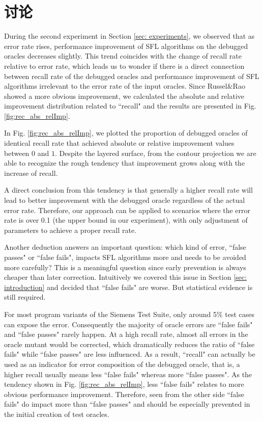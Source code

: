 \section{讨论}

During the second experiment in Section \ref{sec: experiments}, we observed that as error rate rises, performance improvement of SFL algorithms on the debugged oracles decreases slightly. This trend coincides with the change of recall rate relative to error rate, which leads us to wonder if there is a direct connection between recall rate of the debugged oracles and performance improvement of SFL algorithms irrelevant to the error rate of the input oracles. Since Russel\&Rao showed a more obvious improvement, we calculated the absolute and relative improvement distribution related to ``recall" and the results are presented in Fig. \ref{fig:rec_abs_relImp}.

In Fig. \ref{fig:rec_abs_relImp}, we plotted the proportion of debugged oracles of identical recall rate that achieved absolute or relative improvement values between $0$ and $1$. Despite the layered surface, from the contour projection we are able to recognize the rough tendency that improvement grows along with the increase of recall.

A direct conclusion from this tendency is that generally a higher recall rate will lead to better improvement with the debugged oracle regardless of the actual error rate. Therefore, our approach can be applied to scenarios where the error rate is over 0.1 (the upper bound in our experiment), with only adjustment of parameters to achieve a proper recall rate.

Another deduction answers an important question: which kind of error, ``false passes" or ``false fails", impacts SFL algorithms more and needs to be avoided more carefully? This is a meaningful question since early prevention is always cheaper than later correction. Intuitively we covered this issue in Section \ref{sec: introduction} and decided that ``false fails" are worse. But statistical evidence is still required.

For most program variants of the Siemens Test Suite, only around 5\% test cases can expose the error. Consequently the majority of oracle errors are ``false fails" and ``false passes" rarely happen. At a high recall rate, almost all errors in the oracle mutant would be corrected, which dramatically reduces the ratio of ``false fails" while ``false passes" are less influenced. As a result, ``recall" can actually be used as an indicator for error composition of the debugged oracle, that is, a higher recall usually means less ``false fails" whereas more ``false passes". As the tendency shown in Fig. \ref{fig:rec_abs_relImp}, less ``false fails" relates to more obvious performance improvement. Therefore, seen from the other side ``false fails" do impact more than ``false passes" and should be especially prevented in the initial creation of test oracles.



